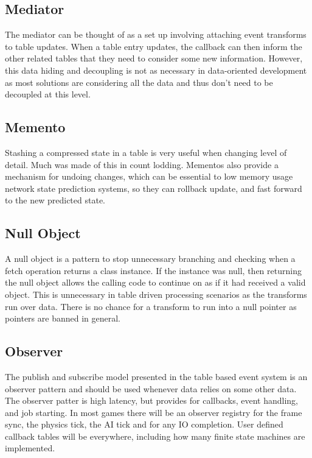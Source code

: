 \subsection{Mediator}

The mediator can be thought of as a set up involving attaching event transforms
to table updates. When a table entry updates, the callback can then inform the
other related tables that they need to consider some new information. However,
this data hiding and decoupling is not as necessary in data-oriented
development as most solutions are considering all the data and thus don't need
to be decoupled at this level.

\subsection{Memento}

Stashing a compressed state in a table is very useful when changing level of
detail. Much was made of this in count lodding. Mementos also provide a
mechanism for undoing changes, which can be essential to low memory usage
network state prediction systems, so they can rollback update, and fast forward
to the new predicted state.

\subsection{Null Object}

A null object is a pattern to stop unnecessary branching and checking when a
fetch operation returns a class instance. If the instance was null, then
returning the null object allows the calling code to continue on as if it had
received a valid object. This is unnecessary in table driven processing
scenarios as the transforms run over data. There is no chance for a transform
to run into a null pointer as pointers are banned in general.

\subsection{Observer}

The publish and subscribe model presented in the table based event system is an
observer pattern and should be used whenever data relies on some other data.
The observer patter is high latency, but provides for callbacks, event
handling, and job starting. In most games there will be an observer registry
for the frame sync, the physics tick, the AI tick and for any IO completion.
User defined callback tables will be everywhere, including how many finite
state machines are implemented.


